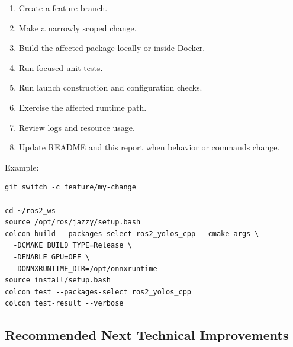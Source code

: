 \documentclass[11pt,a4paper]{article}
\begin{document}
\begin{enumerate}
  \item Create a feature branch.
  \item Make a narrowly scoped change.
  \item Build the affected package locally or inside Docker.
  \item Run focused unit tests.
  \item Run launch construction and configuration checks.
  \item Exercise the affected runtime path.
  \item Review logs and resource usage.
  \item Update README and this report when behavior or commands change.
\end{enumerate}

Example:

\begin{lstlisting}
git switch -c feature/my-change

cd ~/ros2_ws
source /opt/ros/jazzy/setup.bash
colcon build --packages-select ros2_yolos_cpp --cmake-args \
  -DCMAKE_BUILD_TYPE=Release \
  -DENABLE_GPU=OFF \
  -DONNXRUNTIME_DIR=/opt/onnxruntime
source install/setup.bash
colcon test --packages-select ros2_yolos_cpp
colcon test-result --verbose
\end{lstlisting}

\subsection{Recommended Next Technical Improvements}
\end{document}
